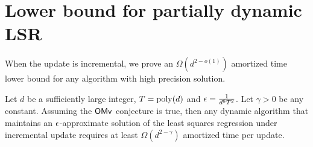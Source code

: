 \section{Lower bound for partially dynamic LSR}
\label{sec:hard}


When the update is incremental, we prove an $\Omega(d^{2 -o(1)})$ amortized time lower bound for any algorithm with high precision solution.


\begin{theorem}
\label{thm:lower}
Let $d$ be a sufficiently large integer, $T = \operatorname{poly}(d)$ and $\epsilon = \frac{1}{d^8T^2}$. Let $\gamma > 0$ be any constant. Assuming the $\mathsf{OMv}$ conjecture is true, then any dynamic algorithm that maintains an $\epsilon$-approximate solution of the least squares regression under incremental update requires at least $\Omega(d^{2-\gamma})$ amortized time per update.
\end{theorem}


